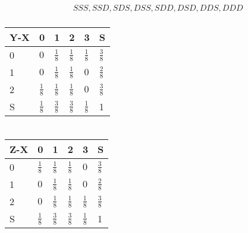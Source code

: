 \documentclass[a4paper]{article}
\begin{document}
\thispagestyle{fancy} %
{}

\section{}
\begin{align*}
	& SSS, SSD, SDS, DSS, SDD, DSD, DDS, DDD \\
\end{align*}

\begin{table}[h]
\begin{tabular}{|l|l|l|l|l|l|}
\hline
      Y-X  & 0 & 1 & 2 & 3 & S\\ \hline
0          & $0$ & $\frac{1}{8}$ & $\frac{1}{8}$ & $\frac{1}{8}$ & $\frac{3}{8}$ \\ \hline
1          & $0$ & $\frac{1}{8}$  & $\frac{1}{8}$ & $0$ & $\frac{2}{8}$ \\ \hline
2          & $\frac{1}{8}$ & $\frac{1}{8}$ & $\frac{1}{8}$ & $0$ & $\frac{3}{8}$ \\ \hline
S          & $\frac{1}{8}$ & $\frac{3}{8}$ & $\frac{3}{8}$ & $\frac{1}{8}$ & 1 \\ \hline
\end{tabular}
\end{table}


\section{}

\begin{table}[h]
\begin{tabular}{|l|l|l|l|l|l|}
\hline
      Z-X  & 0 & 1 & 2 & 3 & S\\ \hline
0          & $\frac{1}{8}$ & $\frac{1}{8}$ & $\frac{1}{8}$ & $0$ & $\frac{3}{8}$ \\ \hline
1          & $0$ & $\frac{1}{8}$  & $\frac{1}{8}$ & $0$ & $\frac{2}{8}$ \\ \hline
2          & $0$ & $\frac{1}{8}$ & $\frac{1}{8}$ & $\frac{1}{8}$ & $\frac{3}{8}$ \\ \hline
S          & $\frac{1}{8}$ & $\frac{3}{8}$ & $\frac{3}{8}$ & $\frac{1}{8}$ & 1 \\ \hline
\end{tabular}
\end{table}
\end{document}
